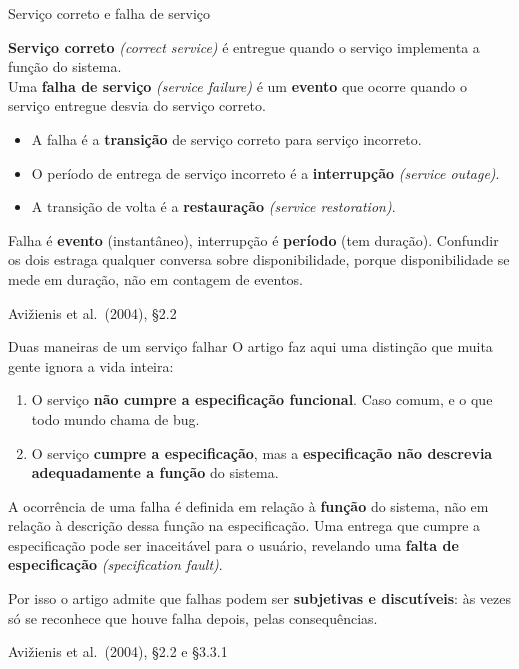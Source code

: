 \documentclass{beamer}
\newcommand{\en}[1]{{\color{depCinza}\textit{#1}}}
\newcommand{\sect}[1]{\par\smallskip\hfill{\tiny\color{black!55}Avi\v{z}ienis et al.\ (2004), #1}}
\begin{document}
\begin{frame}{Servi\c{c}o correto e falha de servi\c{c}o}
    \footnotesize
    \begin{defi}
        \scriptsize
        \textbf{Servi\c{c}o correto} \en{(correct service)} \'e entregue quando o servi\c{c}o implementa a fun\c{c}\~ao do sistema.\\[3pt]
        Uma \textbf{falha de servi\c{c}o} \en{(service failure)} \'e um \textbf{evento} que ocorre quando o servi\c{c}o entregue desvia do servi\c{c}o correto.
    \end{defi}
    \medskip
    \begin{itemize}
        \item A falha \'e a \textbf{transi\c{c}\~ao} de servi\c{c}o correto para servi\c{c}o incorreto.
        \item O per\'iodo de entrega de servi\c{c}o incorreto \'e a \textbf{interrup\c{c}\~ao} \en{(service outage)}.
        \item A transi\c{c}\~ao de volta \'e a \textbf{restaura\c{c}\~ao} \en{(service restoration)}.
    \end{itemize}
    \medskip
    \begin{armadilha}
        \scriptsize
        Falha \'e \textbf{evento} (instant\^aneo), interrup\c{c}\~ao \'e \textbf{per\'iodo} (tem dura\c{c}\~ao). Confundir os dois estraga qualquer conversa sobre disponibilidade, porque disponibilidade se mede em dura\c{c}\~ao, n\~ao em contagem de eventos.
    \end{armadilha}
    \sect{\S2.2}
\end{frame}

\begin{frame}{Duas maneiras de um servi\c{c}o falhar}
    \footnotesize
    O artigo faz aqui uma distin\c{c}\~ao que muita gente ignora a vida inteira:
    \medskip
    \begin{enumerate}
        \item O servi\c{c}o \textbf{n\~ao cumpre a especifica\c{c}\~ao funcional}. Caso comum, e o que todo mundo chama de bug.
        \item O servi\c{c}o \textbf{cumpre a especifica\c{c}\~ao}, mas a \textbf{especifica\c{c}\~ao n\~ao descrevia adequadamente a fun\c{c}\~ao} do sistema.
    \end{enumerate}
    \medskip
    \begin{defi}
        \scriptsize
        A ocorr\^encia de uma falha \'e definida em rela\c{c}\~ao \`a \textbf{fun\c{c}\~ao} do sistema, n\~ao em rela\c{c}\~ao \`a descri\c{c}\~ao dessa fun\c{c}\~ao na especifica\c{c}\~ao. Uma entrega que cumpre a especifica\c{c}\~ao pode ser inaceit\'avel para o usu\'ario, revelando uma \textbf{falta de especifica\c{c}\~ao} \en{(specification fault)}.
    \end{defi}
    \medskip
    \begin{ancora}
        \footnotesize
        Por isso o artigo admite que falhas podem ser \textbf{subjetivas e discut\'iveis}: \`as vezes s\'o se reconhece que houve falha depois, pelas consequ\^encias.
    \end{ancora}
    \sect{\S2.2 e \S3.3.1}
\end{frame}
\end{document}

